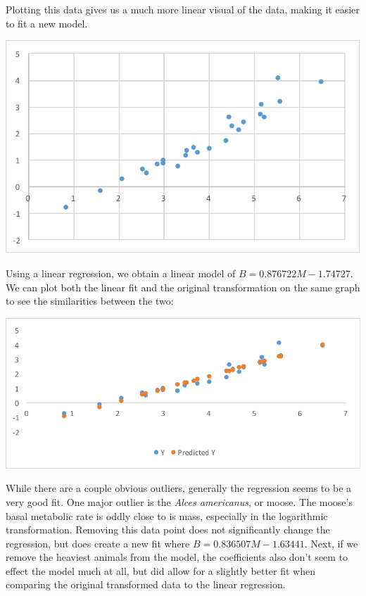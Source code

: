\documentclass[10pt,letterpaper]{article}
\begin{document}
			Plotting this data gives us a much more linear visual of the data, making it easier to fit a new model.
			\newline \newline
			\centerline{\includegraphics{Picture8.pdf}}
			\newline \newline
			Using a linear regression, we obtain a linear model of $B = 0.876722M - 1.74727$. We can plot both the linear fit and the original transformation on the same graph to see the similarities between the two:
			\newline \newline
			\centerline{\includegraphics{Picture9.pdf}}
			\newline \newline
			While there are a couple obvious outliers, generally the regression seems to be a very good fit. One major outlier is the \emph{Alces americanus}, or moose. The moose's basal metabolic rate is oddly close to is mass, especially in the logarithmic transformation. Removing this data point does not significantly change the regression, but does create a new fit where $B = 0.836507M - 1.63441$. Next, if we remove the heaviest animals from the model, the coefficients also don't seem to effect the model much at all, but did allow for a slightly better fit when comparing the original transformed data to the linear regression.
\end{document}

